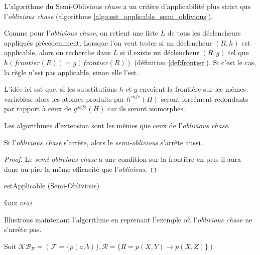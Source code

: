 
L'algorithme du Semi-Oblivious \textit{chase} a un critère d'applicabilité plus strict que l'\textit{oblivious chase} (algorithme \ref{algo:est_applicable_semi_oblivious}). 
\par Comme pour l'\textit{oblivious chase}, on retient une liste $L$ de tous les déclencheurs appliqués précédemment. Lorsque l'on veut tester si un déclencheur $(R,h)$ est applicable, alors on recherche dans $L$ si il existe un déclencheur $(R,g)$ tel que $h(frontier(R)) = g(frontier(R))$ (définition \ref{def:frontier}). Si c'est le cas, la règle n'est pas applicable, sinon elle l'est.
\par L'idée ici est que, si les substitutions $h$ et $g$ envoient la frontière sur les mêmes variables, alors les atomes produits par $h^{safe}(H)$ seront forcément redondants par rapport à ceux de $g^{safe}(H)$ car ils seront isomorphes.
\par Les algorithmes d'extension sont les mêmes que ceux de l'\textit{oblivious chase}.

\begin{proposition}
    Si l'\textit{oblivious chase} s'arrête, alors le \textit{semi-oblivious} s'arrête aussi.
\end{proposition}

\begin{proof} Le \textit{semi-oblivious chase} a une condition sur la frontière en plus il aura donc au pire la même efficacité que l'\textit{oblivious}.
\end{proof}

\begin{algorithm}[H]\label{algo:est_applicable_semi_oblivious}
\caption{estApplicable (Semi-Oblivious)}
\SetAlgoLined
\DontPrintSemicolon
{}
    {
        \Return faux
    }
\Return $vrai$
\end{algorithm}
Illustrons maintenant l'algorithme en reprenant l'exemple où l'\textit{oblivious chase} ne s'arrête pas.
\par Soit $\mathcal{KB}_B = (\mathcal{F} = \{p(a,b)\}, \mathcal{R} = \{R = p(X,Y) \rightarrow p(X,Z) \})$


